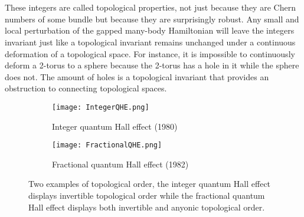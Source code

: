 \\\\
These integers are called topological properties, not just because they are Chern numbers of some bundle but because they are surprisingly robust. Any small and local perturbation of the gapped many-body Hamiltonian will leave the integers invariant just like a topological invariant remains unchanged under a continuous deformation of a topological space. For instance, it is impossible to continuously deform a 2-torus to a sphere because the 2-torus has a hole in it while the sphere does not. The amount of holes is a topological invariant that provides an obstruction to connecting topological spaces.
\begin{figure}
	\centering
	\begin{subfigure}[b]{0.45\textwidth}
		\centering
		\texttt{[image: IntegerQHE.png]}
		\caption{Integer quantum Hall effect (1980)}
	\end{subfigure}
	\hfill
	\begin{subfigure}[b]{0.45\textwidth}
		\centering
		\texttt{[image: FractionalQHE.png]}
		\caption{Fractional quantum Hall effect (1982)}
	\end{subfigure}
	\caption{Two examples of topological order, the integer quantum Hall effect displays invertible topological order while the fractional quantum Hall effect displays both invertible and anyonic topological order.}
	\label{fig:TopologicalOrderFigures}
\end{figure}
